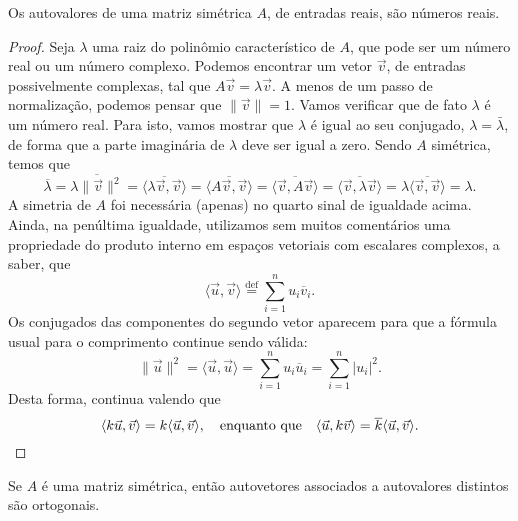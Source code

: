\begin{prop}\label{reais}
	Os autovalores de uma matriz simétrica $A$, de entradas reais, são números reais.
\end{prop}

\begin{proof}
	Seja $\lambda$ uma raiz do polinômio característico de $A$, que pode ser um número real ou um número complexo. Podemos encontrar um vetor $\vec{v}$, de entradas possivelmente complexas, tal que $A\vec{v} = \lambda \vec{v}$. A menos de um passo de normalização, podemos pensar que $\|\vec{v}\| = 1$. Vamos verificar que de fato $\lambda$ é um número real. Para isto, vamos mostrar que $\lambda$ é igual ao seu conjugado, $\lambda = \bar{\lambda}$, de forma que a parte imaginária de $\lambda$ deve ser igual a zero. Sendo $A$ simétrica, temos que
	\begin{equation}
	\overline{\lambda} = \overline{\lambda \|\vec{v}\|^2} = \overline{\langle \lambda \vec{v}, \vec{v} \rangle} = \overline{\langle A \vec{v}, \vec{v} \rangle} = \overline{\langle \vec{v}, A \vec{v} \rangle} = \overline{\langle \vec{v}, \lambda \vec{v} \rangle} = \lambda \overline{\langle \vec{v}, \vec{v} \rangle} = \lambda.
	\end{equation} A simetria de $A$ foi necessária (apenas) no quarto sinal de igualdade acima. Ainda, na penúltima igualdade, utilizamos sem muitos comentários uma propriedade do produto interno em espaços vetoriais com escalares complexos, a saber, que
	\begin{equation}
	\langle\vec{u}, \vec{v}\rangle \stackrel{\text{def}}{=} \sum_{i=1}^{n} u_i \overline{v}_i.
	\end{equation} Os conjugados das componentes do segundo vetor aparecem para que a fórmula usual para o comprimento continue sendo válida:
	\begin{equation}
	\| \vec{u} \|^2 = \langle\vec{u}, \vec{u}\rangle = \sum_{i=1}^{n} u_i \overline{u}_i = \sum_{i=1}^{n} |u_i|^2.
	\end{equation} Desta forma, continua valendo que
	\begin{equation}
	\langle k\vec{u}, \vec{v} \rangle = k \langle \vec{u}, \vec{v}\rangle, \quad \text{enquanto que} \quad \langle \vec{u},k\vec{v}\rangle = \overline{k} \langle \vec{u}, \vec{v}\rangle. \qedhere
	\end{equation}
\end{proof}

\begin{prop}\label{ortog}
	Se $A$ é uma matriz simétrica, então autovetores associados a autovalores distintos são ortogonais.
\end{prop}

